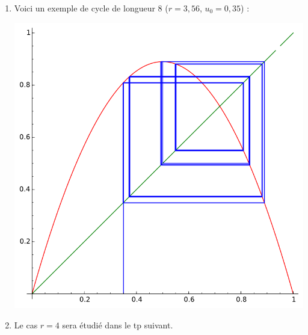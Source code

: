 \documentclass[class=report,crop=false]{standalone}
\begin{document}
\begin{enumerate}
  \item Voici un exemple de cycle de longueur $8$ ($r=3,56$, $u_0=0,35$) :
    \begin{center}
  \includegraphics[scale=0.4]{figures/chaos10}
  \end{center}
  
  \item Le cas $r=4$ sera étudié dans le tp suivant.
      
     
\end{enumerate}
\end{document}
